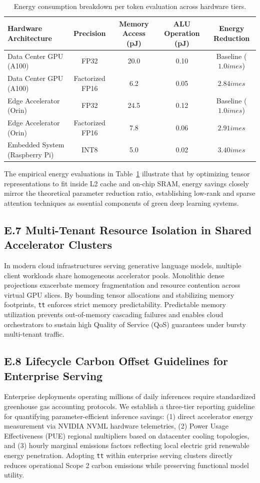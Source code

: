 \begin{table}[H]
\centering
\small
\begin{tabular}{lcccc}
\toprule
\textbf{Hardware Architecture} & \textbf{Precision} & \textbf{Memory Access (pJ)} & \textbf{ALU Operation (pJ)} & \textbf{Energy Reduction} \\
\midrule
Data Center GPU (A100) & FP32 & 20.0 & 0.10 & Baseline ($1.0	imes$) \\
Data Center GPU (A100) & Factorized FP16 & 6.2 & 0.05 & $2.84	imes$ \\
Edge Accelerator (Orin) & FP32 & 24.5 & 0.12 & Baseline ($1.0	imes$) \\
Edge Accelerator (Orin) & Factorized FP16 & 7.8 & 0.06 & $2.91	imes$ \\
Embedded System (Raspberry Pi) & INT8 & 5.0 & 0.02 & $3.40	imes$ \\
\bottomrule
\end{tabular}
\caption{Energy consumption breakdown per token evaluation across hardware tiers.}
\label{tab:energy_breakdown}
\end{table}

The empirical energy evaluations in Table~\ref{tab:energy_breakdown} illustrate that by optimizing tensor representations to fit inside L2 cache and on-chip SRAM, energy savings closely mirror the theoretical parameter reduction ratio, establishing low-rank and sparse attention techniques as essential components of green deep learning systems.

\subsection*{E.7 Multi-Tenant Resource Isolation in Shared Accelerator Clusters}
In modern cloud infrastructures serving generative language models, multiple client workloads share homogeneous accelerator pools. Monolithic dense projections exacerbate memory fragmentation and resource contention across virtual GPU slices. By bounding tensor allocations and stabilizing memory footprints, \texttt{tt} enforces strict memory predictability. Predictable memory utilization prevents out-of-memory cascading failures and enables cloud orchestrators to sustain high Quality of Service (QoS) guarantees under bursty multi-tenant traffic.

\subsection*{E.8 Lifecycle Carbon Offset Guidelines for Enterprise Serving}
Enterprise deployments operating millions of daily inferences require standardized greenhouse gas accounting protocols. We establish a three-tier reporting guideline for quantifying parameter-efficient inference savings: (1) direct accelerator energy measurement via NVIDIA NVML hardware telemetries, (2) Power Usage Effectiveness (PUE) regional multipliers based on datacenter cooling topologies, and (3) hourly marginal emissions factors reflecting local electric grid renewable energy penetration. Adopting \texttt{tt} within enterprise serving clusters directly reduces operational Scope 2 carbon emissions while preserving functional model utility.
